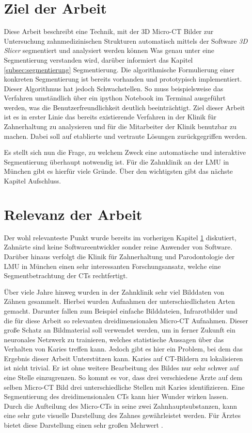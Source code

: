\section{Ziel der Arbeit}
\label{sec:ziel_der_arbeit} Diese Arbeit beschreibt eine Technik, mit der \ac{3D}
Micro-CT Bilder zur Untersuchung zahnmedizinischen Strukturen automatisch
mittels der Software \textit{3D Slicer} segmentiert und analysiert werden können
Was genau unter eine Segmentierung verstanden wird, darüber informiert das
Kapitel \ref{subsec:segmentierung} Segmentierung. Die algorithmische Formulierung
einer konkreten Segmentierung ist bereits vorhanden und prototypisch implementiert.
Dieser Algorithmus hat jedoch Schwachstellen. So muss beispielsweise das Verfahren
umständlich über ein ipython Notebook im Terminal ausgeführt werden, was die
Benutzerfreundlichkeit deutlich beeinträchtigt. Ziel dieser Arbeit ist es in erster
Linie das bereits existierende Verfahren in der Klinik für Zahnerhaltung zu analysieren
und für die Mitarbeiter der Klinik benutzbar zu machen. Dabei soll auf
etablierte und vertraute Lösungen zurückgegriffen werden.

Es stellt sich nun die Frage, zu welchem Zweck eine automatische und interaktive
Segmentierung überhaupt notwendig ist. Für die Zahnklinik an der LMU in München
gibt es hierfür viele Gründe. Über den wichtigsten gibt das nächste Kapitel Aufschluss.

\section{Relevanz der Arbeit}
\label{sec:relevanz_der_arbeit} Der wohl relevanteste Punkt wurde bereits im vorherigen
Kapitel \ref{sec:ziel_der_arbeit} diskutiert, Zahnärte sind keine
Softwareentwickler sonder reine Anwender von Software. Darüber hinaus verfolgt die
Klinik für Zahnerhaltung und Parodontologie der LMU in München einen sehr interessanten
Forschungsansatz, welche eine Segmentbetrachtung der CTs rechtfertigt.

Über viele Jahre hinweg wurden in der Zahnklinik sehr viel Bilddaten von Zähnen
gesammelt. Hierbei wurden Aufnahmen der unterschiedlichsten Arten gemacht.
Darunter fallen zum Beispiel einfache Bilddateien, Infrarotbilder und die für diese
Arbeit so relevanten dreidimensionalen Micro-CT Aufnahmen. Dieser große Schatz
an Bildmaterial soll verwendet werden, um in ferner Zukunft ein neuronales Netzwerk
zu trainieren, welches statistische Aussagen über das Verhalten von Karies
treffen kann. Jedoch gibt es hier ein Problem, bei dem das Ergebnis dieser
Arbeit Unterstützen kann. Karies auf CT-Bildern zu lokalisieren ist nicht trivial.
Er ist ohne weitere Bearbeitung des Bildes nur sehr schwer auf eine Stelle
einzugrenzen. So kommt es vor, dass drei verschiedene Ärzte auf dem selben Micro-CT
Bild drei unterschiedliche Stellen mit Karies identifizieren. Eine Segmentierung
des dreidimensionalen CTs kann hier Wunder wirken lassen. Durch die Aufteilung
des Micro-CTs in seine zwei Zahnhauptsubstanzen, kann eine sehr gute visuelle Darstellung
des Zahnes gewährleistet werden. Für Ärztes bietet diese Darstellung einen sehr
großen Mehrwert \citep[vgl.][S. 1]{walter2025projekt}.

